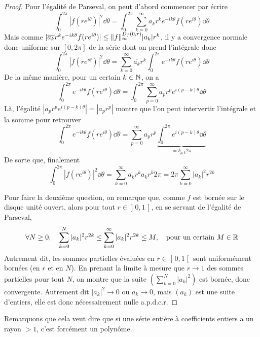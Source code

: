 \documentclass[10pt]{scrartcl}
\begin{document}
    \begin{proof}
        Pour l'égalité de Parseval, on peut d'abord commencer par écrire 
        \[
            \int_0^{2\pi}|f(re^{i\theta})|^2\dd\theta=\int_0^{2\pi}\sum_{k=0}^\infty \overline{a_k}r^ke^{-ik\theta}f(re^{i\theta})\dd\theta
        \]
        Mais comme $|\overline{a_k}r^ke^{-ik\theta}f(re^{i\theta})|\leq \lVert f\rVert_\infty^{D_f(0,r)}|a_k|r^k$, il y a convergence normale donc uniforme sur $[0,2\pi]$
        de la série dont on prend l'intégrale donc 
        \[
            \int_0^{2\pi}|f(re^{i\theta})|^2\dd\theta=\sum_{k=0}^\infty\overline{a_k}r^k\int_0^{2\pi} e^{-ik\theta}f(re^{i\theta})\dd\theta
        \]
        De la même manière, pour un certain $k\in\operatorname{\mathbb N}$, on a 
        \[
            \int_0^{2\pi} e^{-ik\theta}f(re^{i\theta})\dd\theta=\int_0^{2\pi}\sum_{p=0}^\infty a_pr^pe^{i(p-k)\theta}\dd\theta
        \]
        Là, l'égalité $|a_pr^pe^{i(p-k)\theta}|=|a_pr^p|$ montre que l'on peut intervertir l'intégrale et la somme pour retrouver 
        \[
            \int_0^{2\pi} e^{-ik\theta}f(re^{i\theta})\dd\theta=\sum_{p=0}^\infty a_pr^p\underbrace{\int_0^{2\pi} e^{i(p-k)\theta}\dd\theta}_{=\delta_{p,k}2\pi}
        \]
        De sorte que, finalement 
        \[
            \int_0^{2\pi}|f(re^{i\theta})|^2\dd\theta=\sum_{k=0}^\infty\overline{a_k}r^ka_kr^k2\pi=2\pi\sum_{k=0}^\infty|a_k|^2r^{2k}
        \]


        Pour faire la deuxième question, on remarque que, comme $f$ est bornée sur le disque unité ouvert, 
        alors pour tout $r\in\mathopen]0,1\mathclose[$, en se servant de l'égalité de Parseval, 
        \[
            \forall N\geq0,\quad \sum_{k=0}^N|a_k|^2r^{2k}\leq \sum_{k=0}^\infty |a_k|^2r^{2k}\leq M,\quad \text{pour un certain}\ M\in\operatorname{\mathbb R}
        \]
        Autrement dit, les sommes partielles évaluées en $r\in\mathopen]0,1\mathclose[$ sont uniformément bornées (en $r$ et en $N$).
        En prenant la limite à mesure que $r\to 1$ des sommes partielles pour tout $N$, on montre que la suite $(\sum_{k=0}^N|a_k|^2)$ est bornée,
        donc convergente. Autrement dit $|a_k|^2\to 0$ ou $a_k\to 0$, mais $(a_k)$ est une suite d'entiers, elle est donc nécessairement nulle a.p.d.c.r.
    \end{proof}

    \begin{remarks}
        Remarquons que cela veut dire que si une série entière à coefficients entiers a un rayon $>1$, c'est forcément un polynôme. 
    \end{remarks}
\end{document}
